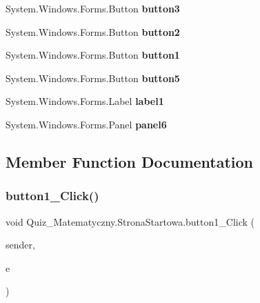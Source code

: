 \begin{DoxyCompactItemize}
System.\+Windows.\+Forms.\+Button {\bfseries button3}
\item 
\mbox{\label{class_quiz___matematyczny_1_1_strona_startowa_ac019147965ed47a60f5997a5b48decdc}} 
System.\+Windows.\+Forms.\+Button {\bfseries button2}
\item 
\mbox{\label{class_quiz___matematyczny_1_1_strona_startowa_a7d7550719e7b27e8609d86e879b5f1e3}} 
System.\+Windows.\+Forms.\+Button {\bfseries button1}
\item 
\mbox{\label{class_quiz___matematyczny_1_1_strona_startowa_af0908ff46093c06d2885a537d1d21974}} 
System.\+Windows.\+Forms.\+Button {\bfseries button5}
\item 
\mbox{\label{class_quiz___matematyczny_1_1_strona_startowa_a645913fc1f5f7b163f35041fe5d75f9f}} 
System.\+Windows.\+Forms.\+Label {\bfseries label1}
\item 
\mbox{\label{class_quiz___matematyczny_1_1_strona_startowa_a7cacd0c72870d5e5121451384a5cf50d}} 
System.\+Windows.\+Forms.\+Panel {\bfseries panel6}
\end{DoxyCompactItemize}


\subsection{Member Function Documentation}
\mbox{\label{class_quiz___matematyczny_1_1_strona_startowa_a7cdd300e897bcd380753f964fc89a58c}} 
\subsubsection{\texorpdfstring{button1\_Click()}{button1\_Click()}}
{\footnotesize\ttfamily void Quiz\+\_\+\+Matematyczny.\+Strona\+Startowa.\+button1\+\_\+\+Click (\begin{DoxyParamCaption}\item[{object}]{sender,  }\item[{Event\+Args}]{e }\end{DoxyParamCaption})\hspace{0.3cm}{\ttfamily [private]}}

